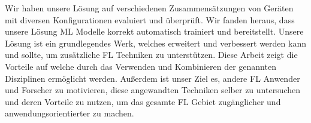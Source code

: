 Wir haben unsere Lösung auf verschiedenen Zusammensätzungen von Geräten mit diversen Konfigurationen evaluiert und überprüft.
Wir fanden heraus, dass unsere Lösung ML Modelle korrekt automatisch trainiert und bereitstellt.
Unsere Lösung ist ein grundlegendes Werk, welches erweitert und verbessert werden kann und sollte, um zusätzliche FL Techniken zu unterstützen.
Diese Arbeit zeigt die Vorteile auf welche durch das Verwenden und Kombinieren der genannten Disziplinen ermöglicht werden.
Außerdem ist unser Ziel es, andere FL Anwender und Forscher zu motivieren, diese angewandten Techniken selber zu untersuchen und deren Vorteile zu nutzen, um das gesamte FL Gebiet zugänglicher und anwendungsorientierter zu machen.